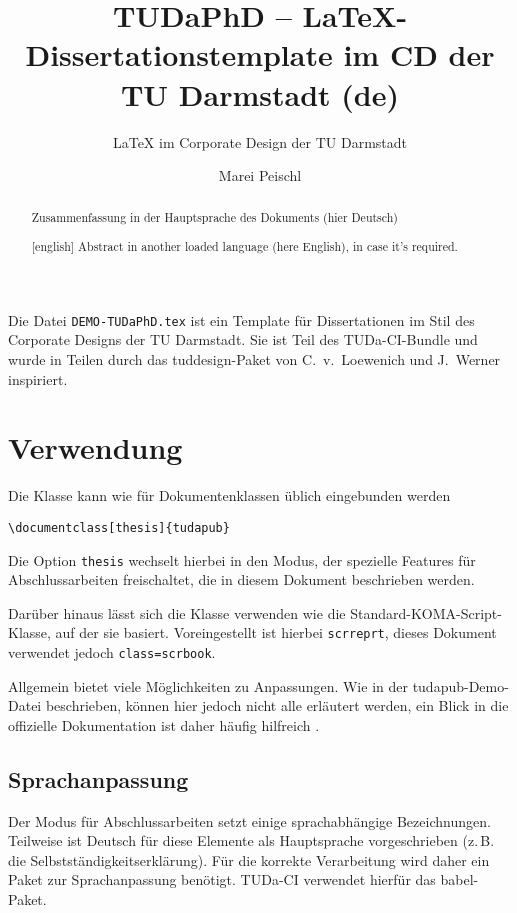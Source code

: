 \documentclass[
	german,%
	ruledheaders=chapter,%
	class=book,%
	thesis={%
			type=dr,
			dr=rernat
		},
	fontsize=11pt,%
	parskip=half-,%
	custommargins=true,%
	marginpar=false,%
	accentcolor=9c,%
]{tudapub}
\title{TUDaPhD -- \LaTeX-Dissertationstemplate im CD der TU Darmstadt (de)}
\subtitle{\LaTeX{} im Corporate Design der TU Darmstadt}
\author{Marei Peischl}
\institute{Institut}
\let\file\texttt
\let\code\texttt
\begin{document}
\maketitle

\affidavit%
\begin{abstract}
	Zusammenfassung in der Hauptsprache des Dokuments (hier Deutsch)
\end{abstract}

\begin{abstract}[english]
	Abstract in another loaded language (here English), in case it's required.
\end{abstract}

\tableofcontents

\mainmatter


Die Datei \file{DEMO-TUDaPhD.tex} ist ein Template für Dissertationen
im Stil des Corporate Designs der TU Darmstadt.
Sie ist Teil des TUDa-CI-Bundle und wurde in Teilen durch das tuddesign-Paket von C.~v.~Loewenich und J.~Werner inspiriert.


\chapter{Verwendung}
Die Klasse kann wie für Dokumentenklassen üblich eingebunden werden
\begin{verbatim}
\documentclass[thesis]{tudapub}
\end{verbatim}
Die Option \code{thesis} wechselt hierbei in den Modus, der spezielle Features für Abschlussarbeiten freischaltet, die in diesem Dokument beschrieben werden.

Darüber hinaus lässt sich die Klasse verwenden wie die Standard-KOMA-Script-Klasse, auf der sie basiert.
Voreingestellt ist hierbei \code{scrreprt}, dieses Dokument verwendet jedoch \code{class=scrbook}.

Allgemein bietet \KOMAScript{} viele Möglichkeiten zu Anpassungen. Wie in der tudapub-Demo-Datei beschrieben, können hier jedoch nicht alle erläutert werden, ein Blick in die offizielle Dokumentation ist daher häufig hilfreich \cite{scrguide}.

\section{Sprachanpassung}
Der Modus für Abschlussarbeiten setzt einige sprachabhängige Bezeichnungen.
Teilweise ist Deutsch für diese Elemente als Hauptsprache vorgeschrieben (z.\,B. die Selbstständigkeitserklärung). Für die korrekte Verarbeitung wird daher ein Paket zur Sprachanpassung benötigt.
TUDa-CI verwendet hierfür das babel-Paket.
\end{document}
